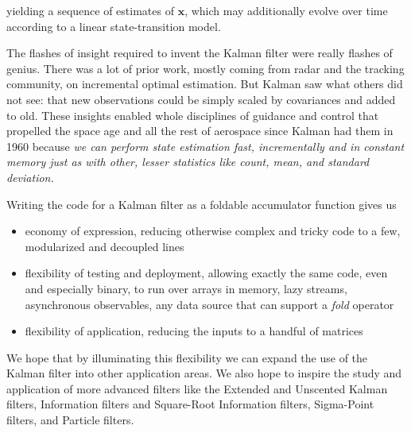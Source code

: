 \documentclass[10pt,oneside,x11names]{article}
\begin{document}
\noindent yielding a sequence of estimates of \(\mathbold{x}\), which may
additionally evolve over time according to a linear state-transition model.

The flashes of insight required to invent the Kalman filter were really flashes
of genius. There was a lot of prior work, mostly coming from radar and the
tracking community, on incremental optimal estimation. But Kalman saw what
others did not see: that new observations could be simply scaled by covariances
and added to old. These insights enabled whole disciplines of guidance and
control that propelled the space age and all the rest of aerospace since Kalman
had them in 1960 because
\emph{we can perform state estimation fast, incrementally and in constant memory just as with other, lesser statistics like count, mean, and standard deviation.}

Writing the code for a Kalman filter as a foldable accumulator function gives us
\begin{itemize}
\item economy of expression, reducing otherwise complex and tricky code
to a few, modularized and decoupled lines
\item flexibility of testing and deployment, allowing exactly the same
code, even and especially binary, to run over arrays in
memory, lazy streams, asynchronous observables, any data source
that can support a \emph{fold} operator
\item flexibility of application, reducing the inputs to a handful
of  matrices
\end{itemize}

We hope that by illuminating this flexibility we can expand the use of the
Kalman filter into other application areas. We also hope to inspire the study
and application of more advanced filters like the Extended and Unscented Kalman
filters, Information filters and Square-Root Information filters, Sigma-Point
filters, and Particle filters.
\end{document}
